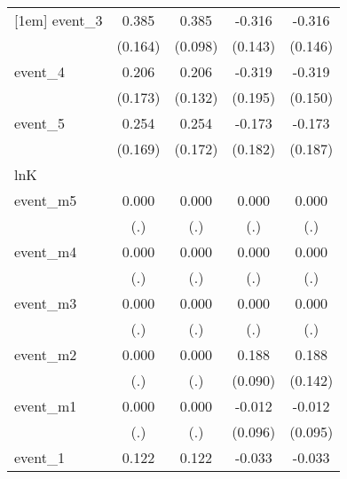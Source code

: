 {\begin{tabular}{l*{4}{c}}
[1em]
event\_3     &       0.385\sym{*}  &       0.385\sym{***}&      -0.316\sym{*}  &      -0.316\sym{*}  \\
            &     (0.164)         &     (0.098)         &     (0.143)         &     (0.146)         \\
[1em]
event\_4     &       0.206         &       0.206         &      -0.319         &      -0.319\sym{*}  \\
            &     (0.173)         &     (0.132)         &     (0.195)         &     (0.150)         \\
[1em]
event\_5     &       0.254         &       0.254         &      -0.173         &      -0.173         \\
            &     (0.169)         &     (0.172)         &     (0.182)         &     (0.187)         \\
\hline
lnK         &                     &                     &                     &                     \\
event\_m5    &       0.000         &       0.000         &       0.000         &       0.000         \\
            &         (.)         &         (.)         &         (.)         &         (.)         \\
[1em]
event\_m4    &       0.000         &       0.000         &       0.000         &       0.000         \\
            &         (.)         &         (.)         &         (.)         &         (.)         \\
[1em]
event\_m3    &       0.000         &       0.000         &       0.000         &       0.000         \\
            &         (.)         &         (.)         &         (.)         &         (.)         \\
[1em]
event\_m2    &       0.000         &       0.000         &       0.188\sym{*}  &       0.188         \\
            &         (.)         &         (.)         &     (0.090)         &     (0.142)         \\
[1em]
event\_m1    &       0.000         &       0.000         &      -0.012         &      -0.012         \\
            &         (.)         &         (.)         &     (0.096)         &     (0.095)         \\
[1em]
event\_1     &       0.122         &       0.122         &      -0.033         &      -0.033         \\

\end{tabular}}
